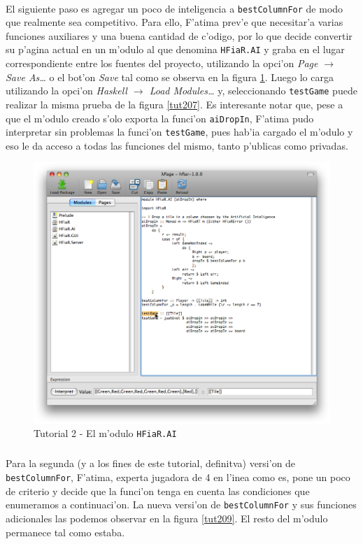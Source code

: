 \documentclass[a4paper]{article}
\begin{document}
\paragraph{}El siguiente paso es agregar un poco de inteligencia a \texttt{bestColumnFor} de modo que realmente sea competitivo.  Para ello, F'atima prev'e que necesitar'a varias funciones auxiliares y una buena cantidad de c'odigo, por lo que decide convertir su p'agina actual en un m'odulo al que denomina \texttt{HFiaR.AI} y graba en el lugar correspondiente entre los fuentes del proyecto, utilizando la opci'on \textsl{Page $\rightarrow$ Save As\ldots} o el bot'on \textsl{Save} tal como se observa en la figura \ref{tut208}.  Luego lo carga utilizando la opci'on \textsl{Haskell $\rightarrow$ Load Modules\ldots} y, seleccionando \texttt{testGame} puede realizar la misma prueba de la figura \ref{tut207}.  Es interesante notar que, pese a que el m'odulo creado s'olo exporta la funci'on \texttt{aiDropIn}, F'atima pudo interpretar sin problemas la funci'on \texttt{testGame}, pues hab'ia cargado el m'odulo y eso le da acceso a todas las funciones del mismo, tanto p'ublicas como privadas.
\begin{figure}[hp]
	\begin{center}
        	\includegraphics[width=.75\textwidth]{pictures/tut2/08}
		\caption{Tutorial 2 - El m'odulo \texttt{HFiaR.AI}}
		\label{tut208}
	\end{center}
\end{figure}
\newpage
\subparagraph{}Para la segunda (y a los fines de este tutorial, definitva) versi'on de \texttt{bestColumnFor}, F'atima, experta jugadora de 4 en l'inea como es, pone un poco de criterio y decide que la funci'on tenga en cuenta las condiciones que enumeramos a continuaci'on.  La nueva versi'on de \texttt{bestColumnFor} y sus funciones adicionales las podemos observar en la figura \ref{tut209}.  El resto del m'odulo permanece tal como estaba.
\end{document}
